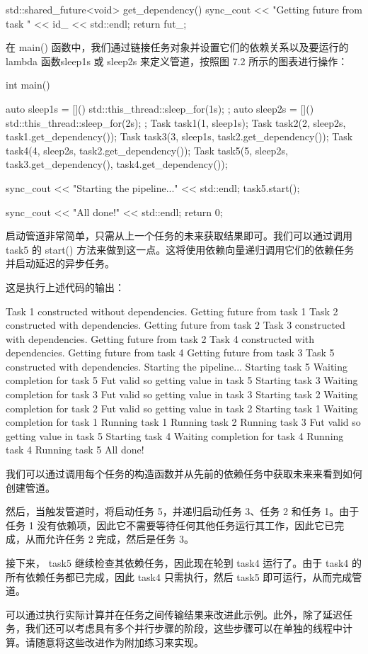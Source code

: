 \begin{cpp}
std::shared_future<void> get_dependency() {
    sync_cout << "Getting future from task "
              << id_ << std::endl;
    return fut_;
}
\end{cpp}

在 main() 函数中，我们通过链接任务对象并设置它们的依赖关系以及要运行的 lambda 函数sleep1s 或 sleep2s 来定义管道，按照图 7.2 所示的图表进行操作：

\begin{cpp}
int main() {
    auto sleep1s = [](){
        std::this_thread::sleep_for(1s);
    };
    auto sleep2s = [](){
        std::this_thread::sleep_for(2s);
    };
    Task task1(1, sleep1s);
    Task task2(2, sleep2s, task1.get_dependency());
    Task task3(3, sleep1s, task2.get_dependency());
    Task task4(4, sleep2s, task2.get_dependency());
    Task task5(5, sleep2s, task3.get_dependency(),
               task4.get_dependency());

    sync_cout << "Starting the pipeline..." << std::endl;
    task5.start();

    sync_cout << "All done!" << std::endl;
    return 0;
}
\end{cpp}

启动管道非常简单，只需从上一个任务的未来获取结果即可。我们可以通过调用 task5 的 start() 方法来做到这一点。这将使用依赖向量递归调用它们的依赖任务并启动延迟的异步任务。

这是执行上述代码的输出：

\begin{shell}
Task 1 constructed without dependencies.
Getting future from task 1
Task 2 constructed with dependencies.
Getting future from task 2
Task 3 constructed with dependencies.
Getting future from task 2
Task 4 constructed with dependencies.
Getting future from task 4
Getting future from task 3
Task 5 constructed with dependencies.
Starting the pipeline...
Starting task 5
Waiting completion for task 5
Fut valid so getting value in task 5
Starting task 3
Waiting completion for task 3
Fut valid so getting value in task 3
Starting task 2
Waiting completion for task 2
Fut valid so getting value in task 2
Starting task 1
Waiting completion for task 1
Running task 1
Running task 2
Running task 3
Fut valid so getting value in task 5
Starting task 4
Waiting completion for task 4
Running task 4
Running task 5
All done!
\end{shell}

我们可以通过调用每个任务的构造函数并从先前的依赖任务中获取未来来看到如何创建管道。

然后，当触发管道时，将启动任务 5，并递归启动任务 3、任务 2 和任务 1。由于任务 1 没有依赖项，因此它不需要等待任何其他任务运行其工作，因此它已完成，从而允许任务 2 完成，然后是任务 3。

接下来， task5 继续检查其依赖任务，因此现在轮到 task4 运行了。由于 task4 的所有依赖任务都已完成，因此 task4 只需执行，然后 task5 即可运行，从而完成管道。

可以通过执行实际计算并在任务之间传输结果来改进此示例。此外，除了延迟任务，我们还可以考虑具有多个并行步骤的阶段，这些步骤可以在单独的线程中计算。请随意将这些改进作为附加练习来实现。
